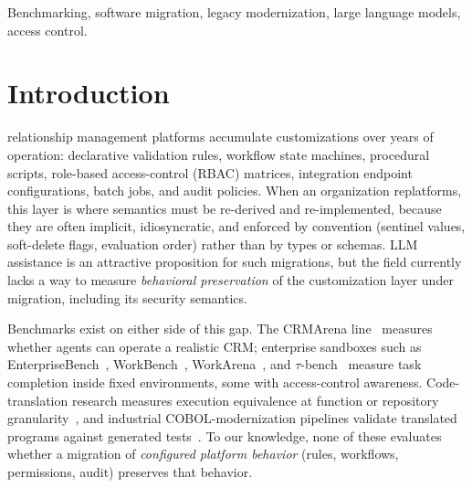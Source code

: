 \documentclass{ieeetj}
\begin{document}
\begin{IEEEkeywords}
Benchmarking, software migration, legacy modernization, large language models, access control.
\end{IEEEkeywords}

\maketitle

\section{Introduction}
\label{sec:intro}
 relationship management platforms accumulate customizations over years of operation:
declarative validation rules, workflow state machines, procedural scripts, role-based
access-control (RBAC) matrices, integration endpoint configurations, batch jobs, and audit
policies. When an organization replatforms, this layer is where semantics must be re-derived
and re-implemented, because they are often implicit, idiosyncratic, and enforced by convention
(sentinel values, soft-delete flags, evaluation order) rather than by types or schemas. LLM assistance is an
attractive proposition for such migrations, but the field currently lacks a way to measure
\emph{behavioral preservation} of the customization layer under migration, including its
security semantics.

Benchmarks exist on either side of this gap. The CRMArena line~\cite{huang2025crmarena,
huang2025crmarenapro} measures whether agents can operate a realistic CRM; enterprise sandboxes
such as EnterpriseBench~\cite{vishwakarma2025enterprisebench}, WorkBench~\cite{styles2024workbench},
WorkArena~\cite{drouin2024workarena}, and $\tau$-bench~\cite{yao2024taubench} measure task
completion inside fixed environments, some with access-control awareness. Code-translation
research measures execution equivalence at function or repository
granularity~\cite{lachaux2020transcoder, yan2023codetransocean, pan2024lost,
ibrahimzada2025alphatrans}, and industrial COBOL-modernization pipelines validate translated
programs against generated tests~\cite{hans2025coboltesting, kumar2025cobolvalidation,
froimovich2025cobolquality}. To our knowledge, none of these evaluates whether a migration of \emph{configured
platform behavior} (rules, workflows, permissions, audit) preserves that behavior.
\end{document}
